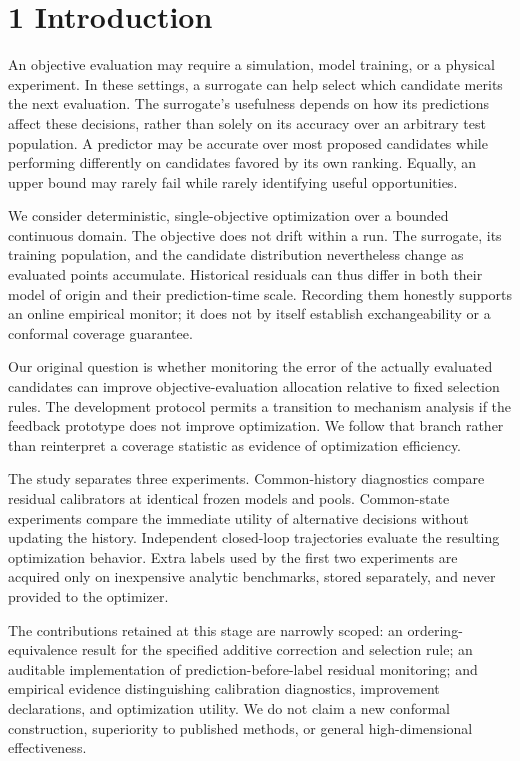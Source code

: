 \documentclass[11pt,a4paper]{article}
\begin{document}
\hypertarget{introduction}{%
\section{1 Introduction}\label{introduction}}

An objective evaluation may require a simulation, model training, or a
physical experiment. In these settings, a surrogate can help select
which candidate merits the next evaluation. The surrogate's usefulness
depends on how its predictions affect these decisions, rather than
solely on its accuracy over an arbitrary test population. A predictor
may be accurate over most proposed candidates while performing
differently on candidates favored by its own ranking. Equally, an upper
bound may rarely fail while rarely identifying useful opportunities.

We consider deterministic, single-objective optimization over a bounded
continuous domain. The objective does not drift within a run. The
surrogate, its training population, and the candidate distribution
nevertheless change as evaluated points accumulate. Historical residuals
can thus differ in both their model of origin and their prediction-time
scale. Recording them honestly supports an online empirical monitor; it
does not by itself establish exchangeability or a conformal coverage
guarantee.

Our original question is whether monitoring the error of the actually
evaluated candidates can improve objective-evaluation allocation
relative to fixed selection rules. The development protocol permits a
transition to mechanism analysis if the feedback prototype does not
improve optimization. We follow that branch rather than reinterpret a
coverage statistic as evidence of optimization efficiency.

The study separates three experiments. Common-history diagnostics
compare residual calibrators at identical frozen models and pools.
Common-state experiments compare the immediate utility of alternative
decisions without updating the history. Independent closed-loop
trajectories evaluate the resulting optimization behavior. Extra labels
used by the first two experiments are acquired only on inexpensive
analytic benchmarks, stored separately, and never provided to the
optimizer.

The contributions retained at this stage are narrowly scoped: an
ordering-equivalence result for the specified additive correction and
selection rule; an auditable implementation of prediction-before-label
residual monitoring; and empirical evidence distinguishing calibration
diagnostics, improvement declarations, and optimization utility. We do
not claim a new conformal construction, superiority to published
methods, or general high-dimensional effectiveness.
\end{document}
